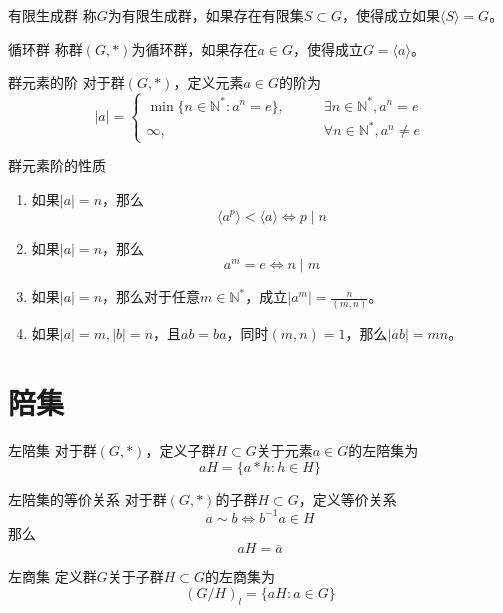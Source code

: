 \documentclass[lang = cn, scheme = chinese, thmcnt = section]{elegantbook}
\newcommand{\N}{\mathbb{N}}            %
\newcommand{\rang}{\rangle}            %
\begin{document}
\begin{definition}{有限生成群}
	称$G$为有限生成群，如果存在有限集$S\subset G$，使得成立如果$\langle S \rang=G$。
\end{definition}

\begin{definition}{循环群}
	称群$(G,*)$为循环群，如果存在$a\in G$，使得成立$G=\langle a \rang$。
\end{definition}

\begin{definition}{群元素的阶}
	对于群$(G,*)$，定义元素$a\in G$的阶为
	$$
	|a|=\begin{cases}
		\min\{ n\in\N^*:a^n=e \},\qquad & \exists n\in\N^*, a^n=e\\
		\infty,\qquad & \forall n\in\N^*,a^n\ne e
	\end{cases}
	$$
\end{definition}

\begin{proposition}{群元素阶的性质}
	\begin{enumerate}
		\item 如果$|a|=n$，那么
		$$
		\langle a^p \rangle<\langle a \rangle\iff p\mid n
		$$
		\item 如果$|a|=n$，那么
		$$
		a^m=e\iff n\mid m
		$$
		\item 如果$|a|=n$，那么对于任意$m\in\mathbb{N}^*$，成立$\displaystyle |a^m|=\frac{n}{(m,n)}$。
		\item 如果$|a|=m,|b|=n$，且$ab=ba$，同时$(m,n)=1$，那么$|ab|=mn$。
	\end{enumerate}
\end{proposition}

\section{陪集}

\begin{definition}{左陪集}
	对于群$(G,*)$，定义子群$H\subset G$关于元素$a\in G$的左陪集为
	$$
	aH=\{ a*h:h\in H \}
	$$
\end{definition}

\begin{theorem}{左陪集的等价关系}
	对于群$(G,*)$的子群$H\subset G$，定义等价关系
	$$
	a\sim b\iff b^{-1}a\in H
	$$
	那么
	$$
	aH=\overline{a}
	$$
\end{theorem}

\begin{definition}{左商集}
	定义群$G$关于子群$H\subset G$的左商集为
	$$
	(G/H)_l=\{ aH:a\in G \}
	$$
\end{definition}
\end{document}
